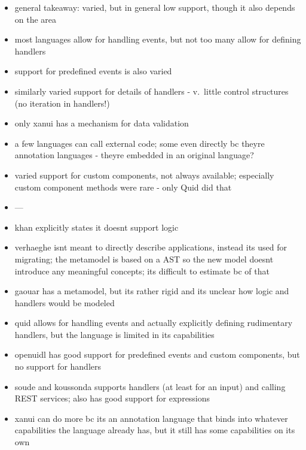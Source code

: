 \begin{itemize}
    \item general takeaway: varied, but in general low support, though it also depends on the area
    \item most languages allow for handling events, but not too many allow for defining handlers
    \item support for predefined events is also varied
    \item similarly varied support for details of handlers - v.\ little control structures (no iteration in handlers!)
    \item only xanui has a mechanism for data validation
    \item a few languages can call external code; some even directly bc theyre annotation languages - theyre embedded in an original language?
    \item varied support for custom components, not always available; especially custom component methods were rare - only Quid did that
    \item ---
    \item khan explicitly states it doesnt support logic
    \item verhaeghe isnt meant to directly describe applications, instead its used for migrating; the metamodel is based on a AST so the new model doesnt introduce any meaningful concepts; its difficult to estimate bc of that
    \item gaouar has a metamodel, but its rather rigid and its unclear how logic and handlers would be modeled
    \item quid allows for handling events and actually explicitly defining rudimentary handlers, but the language is limited in its capabilities
    \item openuidl has good support for predefined events and custom components, but no support for handlers
    \item soude and koussonda supports handlers (at least for an input) and calling REST services; also has good support for expressions
    \item xanui can do more bc its an annotation language that binds into whatever capabilities the language already has, but it still has some capabilities on its own
\end{itemize}


